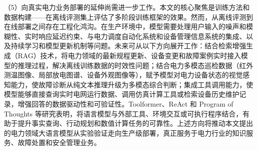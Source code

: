 \documentclass[fontset=fandol,type=master,campus=shenzhen,etitleauto=true]{hithesisbook}
\begin{document}
\begin{conclusions}
\noindent （5）向真实电力业务部署的延伸尚需进一步工作。本文的核心聚焦是训练方法和数据构建------在离线评测集上评估了多阶段训练框架的效果。然而，从离线评测到在线部署之间存在工程化鸿沟。在生产环境中，模型需要处理用户输入的噪声和模糊性、实时响应延迟约束、与电力调度自动化系统和设备管理信息系统的集成、以及持续学习和模型更新机制等问题。未来可从以下方向展开工作：结合检索增强生成（RAG）技术，将电力领域的最新规程更新、设备变更和故障案例实时接入模型的推理过程，解决离线训练数据的时效性问题；结合电力多模态巡检数据（红外测温图像、局部放电图谱、设备外观图像等），赋予模型对电力设备状态的视觉感知能力，使故障诊断从纯文本推理升级为多模态综合判断；集成工具调用能力，使模型能够直接查询实时电网运行数据、调用仿真计算工具或检索设备历史维护记录，增强回答的数据驱动性和可验证性。Toolformer、ReAct 和 Program of Thoughts 等研究表明，将语言模型与外部工具、环境交互或可执行程序结合，有助于提升事实查询、行动规划和数值计算任务的可靠性。上述方向将推动本文提出的电力领域大语言模型从实验验证走向生产级部署，真正服务于电力行业的知识服务、故障处置和安全管理业务。
\end{conclusions}
\end{document}
